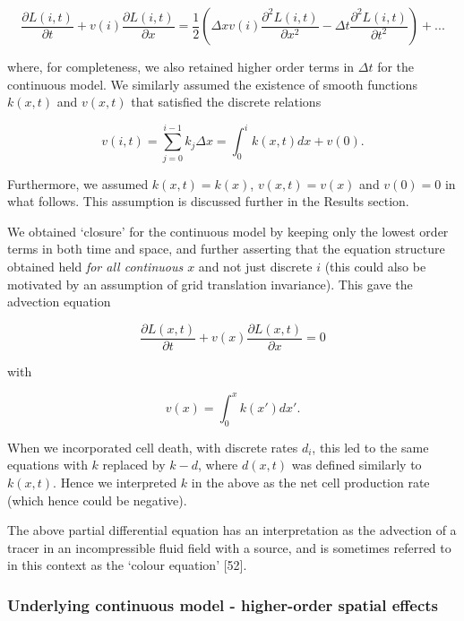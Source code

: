 \documentclass[10pt,letterpaper]{article}
\begin{document}
\begin{equation}\frac{\partial L(i,t)}{\partial t} + v(i)\frac{\partial L(i,t)}{\partial x} = \frac{1}{2}\left(\Delta x v(i) \frac{\partial^2 L(i,t)}{\partial x^2} - \Delta t \frac{\partial^2 L(i,t)}{\partial t^2}\right) + ...\label{eq:model-pde-ts}\end{equation}

where, for completeness, we also retained higher order terms in
\(\Delta t\) for the continuous model. We similarly assumed the
existence of smooth functions \(k(x,t)\) and \(v(x,t)\) that satisfied
the discrete relations

\begin{equation}v(i,t) = \sum_{j=0}^{i-1} k_j \Delta x = \int_0^{i} k(x,t) dx + v(0). \label{eq:model-veloc-ts}\end{equation}

Furthermore, we assumed \(k(x,t) = k(x)\), \(v(x,t) = v(x)\) and
\(v(0) = 0\) in what follows. This assumption is discussed further in
the Results section.

We obtained `closure' for the continuous model by keeping only the
lowest order terms in both time and space, and further asserting that
the equation structure obtained held \emph{for all continuous \(x\)} and
not just discrete \(i\) (this could also be motivated by an assumption
of grid translation invariance). This gave the advection equation

\begin{equation}\frac{\partial L(x,t)}{\partial t} + v(x)\frac{\partial L(x,t)}{\partial x} = 0\label{eq:model-pde}\end{equation}

with

\begin{equation}v(x) = \int_0^{x} k(x') dx'.\label{eq:model-veloc}\end{equation}

When we incorporated cell death, with discrete rates \(d_i\), this led
to the same equations with \(k\) replaced by \(k-d\), where \(d(x,t)\)
was defined similarly to \(k(x,t)\). Hence we interpreted \(k\) in the
above as the net cell production rate (which hence could be negative).

The above partial differential equation has an interpretation as the
advection of a tracer in an incompressible fluid field with a source,
and is sometimes referred to in this context as the `colour equation'
{[}52{]}.

\subsubsection{Underlying continuous model - higher-order spatial
effects}\label{underlying-continuous-model---higher-order-spatial-effects}
\end{document}
